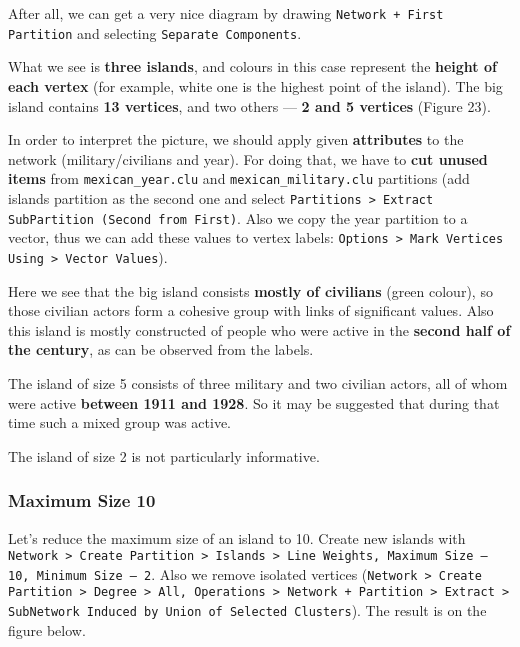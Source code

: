 \FloatBarrier

After all, we can get a very nice diagram by drawing \texttt{Network + First Partition} and selecting \texttt{Separate Components}.


What we see is \textbf{three islands}, and colours in this case represent the \textbf{height of each vertex} (for example, white one is the highest point of the island). The big island contains \textbf{13 vertices}, and two others — \textbf{2 and 5 vertices} (Figure 23).  


In order to interpret the picture, we should apply given \textbf{attributes} to the network (military/civilians and year). For doing that, we have to \textbf{cut unused items} from \texttt{mexican\_year.clu} and \texttt{mexican\_military.clu} partitions (add islands partition as the second one and select \texttt{Partitions > Extract SubPartition (Second from First)}. Also we copy the year partition to a vector, thus we can add these values to vertex labels: \texttt{Options > Mark Vertices Using > Vector Values}).


\FloatBarrier

Here we see that the big island consists \textbf{mostly of civilians} (green colour), so those civilian actors form a cohesive group with links of significant values. Also this island is mostly constructed of people who were active in the \textbf{second half of the century}, as can be observed from the labels.

The island of size 5 consists of three military and two civilian actors, all of whom were active \textbf{between 1911 and 1928}. So it may be suggested that during that time such a mixed group was active.

The island of size 2 is not particularly informative.
\clearpage



\subsubsection{Maximum Size 10}
Let’s reduce the maximum size of an island to 10. Create new islands with \texttt{Network > Create Partition > Islands > Line Weights, Maximum Size — 10, Minimum Size — 2}. Also we remove isolated vertices (\texttt{Network > Create Partition > Degree > All, Operations > Network + Partition > Extract > SubNetwork Induced by Union of Selected Clusters}). The result is on the figure below.

